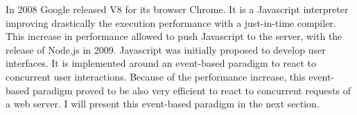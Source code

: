 In 2008 Google released V8 for its browser Chrome.
It is a Javascript interpreter improving drastically the execution performance with a just-in-time compiler.
This increase in performance allowed to push Javascript to the server, with the release of Node.js in 2009.
Javascript was initially proposed to develop user interfaces.
It is implemented around an event-based paradigm to react to concurrent user interactions.
Because of the performance increase, this event-based paradigm proved to be also very efficient to react to concurrent requests of a web server.
I will present this event-based paradigm in the next section.





